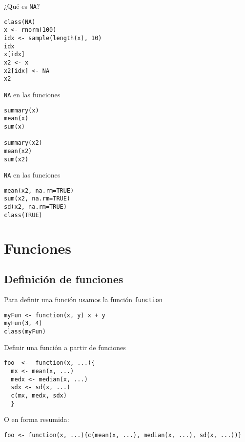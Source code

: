 \documentclass[xcolor={usenames,svgnames,dvipsnames}]{beamer}
\begin{document}
\begin{frame}[fragile,label=sec-2-3-1]{¿Qué es \texttt{NA}?}
 \lstset{language=R,numbers=none}
\begin{lstlisting}
class(NA)
x <- rnorm(100)
idx <- sample(length(x), 10)
idx
x[idx]
x2 <- x
x2[idx] <- NA
x2
\end{lstlisting}
\end{frame}
\begin{frame}[fragile,label=sec-2-3-2]{\texttt{NA} en las funciones}
 \lstset{language=R,numbers=none}
\begin{lstlisting}
summary(x)
mean(x)
sum(x)

summary(x2)
mean(x2)
sum(x2)
\end{lstlisting}
\end{frame}
\begin{frame}[fragile,label=sec-2-3-3]{\texttt{NA} en las funciones}
 \lstset{language=R,numbers=none}
\begin{lstlisting}
mean(x2, na.rm=TRUE)
sum(x2, na.rm=TRUE)
sd(x2, na.rm=TRUE)
class(TRUE)
\end{lstlisting}
\end{frame}

\section{Funciones}
\label{sec-3}

\subsection{Definición de funciones}
\label{sec-3-1}
\begin{frame}[fragile,label=sec-3-1-1]{Para definir una función usamos la función \texttt{function}}
 \lstset{language=R,numbers=none}
\begin{lstlisting}
myFun <- function(x, y) x + y
myFun(3, 4)
class(myFun)
\end{lstlisting}
\end{frame}
\begin{frame}[fragile,label=sec-3-1-2]{Definir una función a partir de funciones}
 \lstset{language=R,numbers=none}
\begin{lstlisting}
foo  <-  function(x, ...){
  mx <- mean(x, ...)
  medx <- median(x, ...)
  sdx <- sd(x, ...)
  c(mx, medx, sdx)
  }
\end{lstlisting}
O en forma resumida:
\lstset{language=R,numbers=none}
\begin{lstlisting}
foo <- function(x, ...){c(mean(x, ...), median(x, ...), sd(x, ...))}
\end{lstlisting}
\end{frame}
\end{document}
